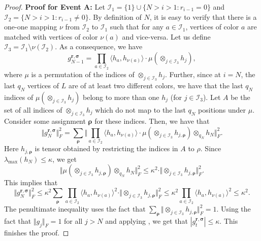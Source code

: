 \documentclass{toc}
\begin{document}
\begin{proof}
\smallskip
\noindent
\textbf{Proof for Event A: } Let $\mathcal{I}_1 = \{1\} \cup \{N>i > 1: r_{i-1} =0 \}$ and $\mathcal{I}_2 =  \{N>i > 1: r_{i-1}  \neq  0 \}$. By definition of $N$, it is easy to verify that there is a one-one mapping $\nu$ from $\mathcal{I}_2$ to $\mathcal{I}_1$ such that for any $a \in \mathcal{I}_1$, vertices of color $a$ are matched with vertices of color $\nu(a)$ and vice-versa. 
Let us define $\mathcal{I}_3 = \mathcal{I}_1 \setminus \nu(\mathcal{I}_2)$. 
As a consequence, we have $$g^{\mathbf{r}, \boldsymbol{\sigma}}_{N-1} =\prod_{a \in \mathcal{I}_2} \langle h_a , h_{\nu(a)} \rangle \cdot \mu (\otimes_{j \in \mathcal{I}_3} h_j),$$
where $\mu$ is a permutation of the indices of  $\otimes_{j \in \mathcal{I}_3} h_j$. Further, since at $i=N$, the last $q_N$ vertices of $L$ are of at least two different colors, we have that 
the last $q_N$ indices of $\mu (\otimes_{j \in \mathcal{I}_3} h_j)$ belong to more than one $h_j$ (for $j \in \mathcal{I}_3$). Let $A$ be the set of all indices of $\otimes_{j \in \mathcal{I}_3} h_j$ which do not map to the last $q_N$ positions under $\mu$. Consider some assignment $\boldsymbol{\rho}$ for these indices. Then, we have that 
\[
\Vert g^{\mathbf{r}, \boldsymbol{\sigma}}_{N} \Vert_F^2 = \sum_{\boldsymbol{\rho}} \Vert \prod_{a \in \mathcal{I}_2} \langle h_a , h_{\nu(a)} \rangle \cdot \mu (\otimes_{j \in \mathcal{I}_3} h_{j, \boldsymbol{\rho}}) \otimes_{q_N} h_N \Vert_F^2.\]
Here $h_{j, \boldsymbol{\rho}}$ is tensor obtained by restricting the indices in $A$ to $\rho$. Since $\lambda_{\max}(h_N) \le \kappa$, we get
\[
\Vert \mu (\otimes_{j \in \mathcal{I}_3} h_{j, \boldsymbol{\rho}}) \otimes_{q_N} h_N \Vert_F^2 \le \kappa^2 \cdot \Vert \otimes_{j \in \mathcal{I}_3} h_{j, \boldsymbol{\rho}}\Vert_F^2. 
\]
This implies that 
\[
\Vert g^{\mathbf{r}, \boldsymbol{\sigma}}_{N} \Vert_F^2 \le \kappa^2  \sum_{\boldsymbol{\rho}}  \prod_{a \in \mathcal{I}_2} \langle h_a , h_{\nu(a)} \rangle^2 \cdot  \Vert \otimes_{j \in \mathcal{I}_3} h_{j, \boldsymbol{\rho}}\Vert_F^2 \le  \kappa^2 \prod_{a \in \mathcal{I}_2} \langle h_a , h_{\nu(a)} \rangle^2  \le \kappa^2. 
\]
The penultimate inequality uses the fact that $\sum_{\boldsymbol{\rho}}  \Vert \otimes_{j \in \mathcal{I}_3} h_{j, \boldsymbol{\rho}}\Vert_F^2=1$. Using the fact that $\Vert g_j \Vert_F=1$ for all $j>N$ and applying , we get that $|g^{\mathbf{r}, \boldsymbol{\sigma}}_{t}|\le \kappa$. This finishes the proof.


\end{proof}
\end{document}
